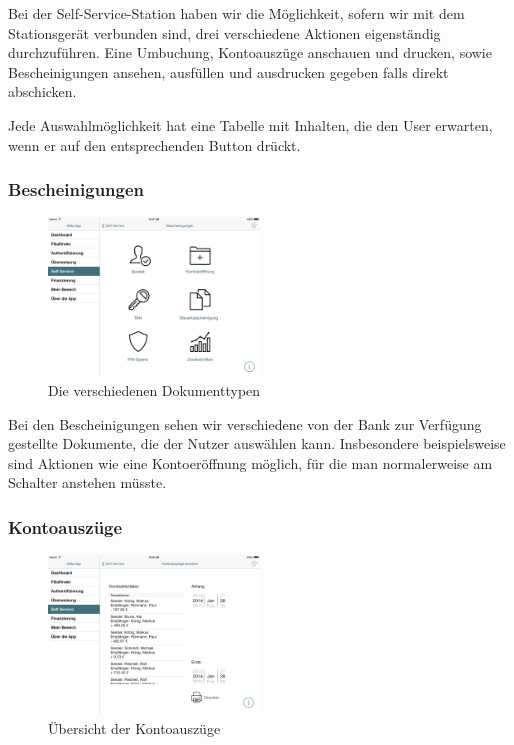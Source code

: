 \noindent	Bei der Self-Service-Station haben wir die Möglichkeit, sofern wir mit dem Stationsgerät verbunden sind, drei verschiedene Aktionen eigenständig durchzuführen. Eine Umbuchung, Kontoauszüge anschauen und drucken, sowie Bescheinigungen ansehen, ausfüllen und ausdrucken gegeben falls direkt abschicken.

	Jede Auswahlmöglichkeit hat eine Tabelle mit Inhalten, die den User erwarten, wenn er auf den entsprechenden Button drückt.

\subsubsection{Bescheinigungen}
\begin{figure}[h]
	\centering
  \includegraphics[width=0.5\textwidth]{Pictures/Bescheinigungen}
	\caption{Die verschiedenen Dokumenttypen}
	\label{fig6}
\end{figure}

	Bei den Bescheinigungen sehen wir verschiedene von der Bank zur Verfügung gestellte Dokumente, die der Nutzer auswählen kann. Insbesondere beispielsweise sind Aktionen wie eine Kontoeröffnung möglich, für die man normalerweise am Schalter anstehen müsste.

\subsubsection{Kontoauszüge}
\begin{figure}[h]
	\centering
  \includegraphics[width=0.5\textwidth]{Pictures/kontoauszuege}
	\caption{Übersicht der Kontoauszüge}
	\label{fig7}
\end{figure}

